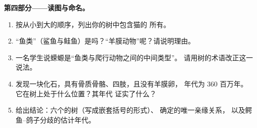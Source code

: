 \begin{problem}
\medskip
\noindent\textbf{第四部分——读图与命名。}
\begin{enumerate}[resume]
  \item 按从小到大的顺序，列出你的树中包含猫的
        所有。
  \item “鱼类”（鲨鱼与鲑鱼）是吗？“羊膜动物”呢？请说明理由。
  \item 一名学生说蝾螈是“鱼类与爬行动物之间的中间类型”。
        请用树的术语改正这一说法。
  \item 发现一块化石，具有骨质骨骼、四肢，且没有羊膜卵，
        年代为 360 百万年。它在树上处于什么位置？其年代
        证实了什么？
  \item 给出结论：六个的树（写成嵌套括号的形式）、
         确定的唯一亲缘关系，
        以及鳄鱼–鸽子分歧的估计年代。
\end{enumerate}
\end{problem}
